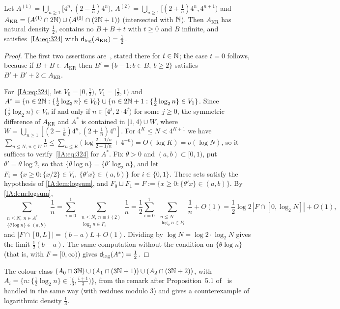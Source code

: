 \begin{proposition}\label{IA:prop:KR}
Let $A^{(1)}=\bigcup_{n\ge1}[4^n,(2-\frac1n)4^n)$, $A^{(2)}=\bigcup_{n\ge1}[(2+\frac1n)4^n,4^{n+1})$
and $A_{\mathrm{KR}}=(A^{(1)}\cap2\mathbb{N})\cup(A^{(2)}\cap(2\mathbb{N}+1))$ (intersected with $\mathbb{N}$). Then
$A_{\mathrm{KR}}$ has natural density $\frac12$, contains no $B+B+t$ with $t\ge0$ and $B$ infinite,
and satisfies~\eqref{IA:eq:324} with $\mathsf{d}_{\log}(A_{\mathrm{KR}})=\frac12$.
\end{proposition}

\begin{proof}
The first two assertions are~\cite[Proposition~4.2]{kousek2024infinite}, stated there for $t\in\mathbb{N}$;
the case $t=0$ follows, because if $B+B\subset A_{\mathrm{KR}}$ then $B'=\{b-1:b\in B,\ b\ge2\}$
satisfies $B'+B'+2\subset A_{\mathrm{KR}}$.

For~\eqref{IA:eq:324}, let $V_0=[0,\frac12)$, $V_1=[\frac12,1)$ and
$A^*=\{n\in2\mathbb{N}:\{\frac12\log_2n\}\in V_0\}\cup\{n\in2\mathbb{N}+1:\{\frac12\log_2n\}\in V_1\}$. Since
$\{\frac12\log_2n\}\in V_0$ if and only if $n\in[4^j,2\cdot4^j)$ for some $j\ge0$, the symmetric
difference of $A_{\mathrm{KR}}$ and $A^*$ is contained in $[1,4)\cup W$, where
$W=\bigcup_{n\ge1}[(2-\frac1n)4^n,(2+\frac1n)4^n]$. For $4^K\le N<4^{K+1}$ we have
$\sum_{n\le N,\,n\in W}\frac1n\le\sum_{n\le K}\big(\log\frac{2+1/n}{2-1/n}+4^{-n}\big)=O(\log K)
=o(\log N)$, so it suffices to verify~\eqref{IA:eq:324} for $A^*$. Fix $\theta>0$ and
$(a,b)\subset[0,1)$, put $\theta'=\theta\log2$, so that $\{\theta\log n\}=\{\theta'\log_2n\}$, and
let $F_i=\{x\ge0:\{x/2\}\in V_i,\ \{\theta'x\}\in(a,b)\}$ for $i\in\{0,1\}$. These sets satisfy the
hypothesis of \cref{IA:lem:logsum}, and $F_0\sqcup F_1=F:=\{x\ge0:\{\theta'x\}\in(a,b)\}$. By
\cref{IA:lem:logsum},
\[
\sum_{\substack{n\le N,\ n\in A^*\\ \{\theta\log n\}\in(a,b)}}\frac1n
=\sum_{i=0}^1\ \sum_{\substack{n\le N,\ n\equiv i\ (2)\\ \log_2n\in F_i}}\frac1n
=\frac12\sum_{i=0}^1\ \sum_{\substack{n\le N\\ \log_2n\in F_i}}\frac1n+O(1)
=\frac12\log 2\,|F\cap[0,\log_2N]|+O(1),
\]
and $|F\cap[0,L]|=(b-a)L+O(1)$. Dividing by $\log N=\log2\cdot\log_2N$ gives the limit
$\frac12(b-a)$. The same computation without the condition on $\{\theta\log n\}$ (that is, with
$F=[0,\infty)$) gives $\mathsf{d}_{\log}(A^*)=\frac12$.
\end{proof}

The colour class $(A_0\cap3\mathbb{N})\cup(A_1\cap(3\mathbb{N}+1))\cup(A_2\cap(3\mathbb{N}+2))$, with
$A_i=\{n:\{\frac12\log_2n\}\in[\frac i3,\frac{i+1}3)\}$, from the remark after
Proposition~5.1 of~\cite{kousek2024infinite} is handled in the same way (with residues modulo $3$)
and gives a counterexample of logarithmic density $\frac13$.

